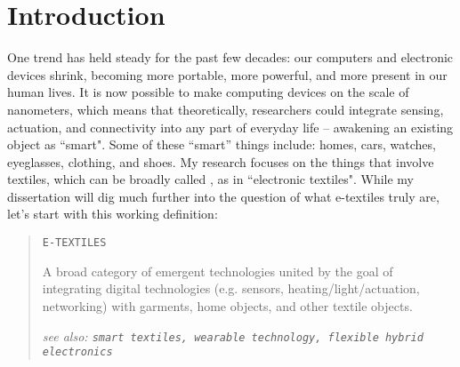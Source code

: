 \chapter{Introduction}
\label{ch-intro}


One trend has held steady for the past few decades: our computers and electronic devices shrink, becoming more portable, more powerful, and more present in our human lives. It is now possible to make computing devices on the scale of nanometers, which means that theoretically, researchers could integrate sensing, actuation, and connectivity into any part of everyday life -- awakening an existing object as ``smart". Some of these ``smart'' things include: homes, cars, watches, eyeglasses, clothing, and shoes. My research focuses on the things that involve textiles, which can be broadly called , as in ``electronic textiles". 
While my dissertation will dig much further into the question of what e-textiles truly are, let's start with this working definition:

\begin{quote}
  \texttt{E-TEXTILES}

  A broad category of emergent technologies united by the goal of integrating digital technologies (e.g. sensors, heating/light/actuation, networking) with garments, home objects, and other textile objects.

  \textit{see also: \texttt{smart textiles, wearable technology, flexible hybrid electronics}}
\end{quote}



